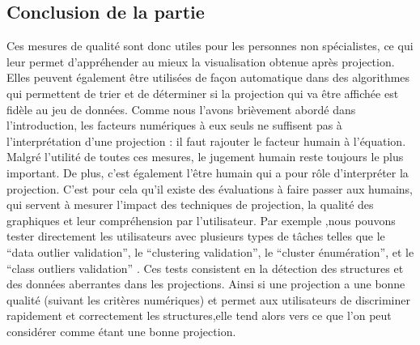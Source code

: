 \subsection{Conclusion de la partie} 
Ces mesures de qualité sont donc utiles pour les personnes non spécialistes, ce qui leur permet d’appréhender au mieux la visualisation obtenue après projection.
Elles peuvent également être utilisées de façon automatique dans des algorithmes qui permettent de trier et de déterminer si la projection qui va être affichée est fidèle au jeu de données\cite{bertini2011quality-AutomatisationAlgo}. 
\newline
Comme nous l’avons brièvement abordé dans l'introduction, les facteurs numériques à eux seuls ne suffisent pas à l’interprétation d’une projection : il faut rajouter le facteur humain à l’équation.
Malgré l’utilité de toutes ces mesures, le jugement humain reste toujours le plus important\cite{AndradaTatu2010visual}. De plus, c'est également l’être humain qui a pour rôle d’interpréter la projection.  C’est pour cela qu’il existe des évaluations à faire passer aux humains, qui servent à mesurer l’impact des techniques de projection, la qualité des graphiques et leur compréhension par l’utilisateur. Par exemple ,nous pouvons tester directement les utilisateurs avec plusieurs types de tâches telles que le “data outlier validation”, le “clustering validation”, le “cluster énumération”, et le “class outliers validation” \cite{HeulotAnEvaluation}. 
Ces tests consistent en la détection des structures et des données aberrantes dans les projections.
Ainsi si une projection a une bonne qualité (suivant les critères numériques) et permet aux utilisateurs de discriminer rapidement et correctement les structures,elle tend alors vers ce que l’on peut considérer comme étant une bonne projection.
 







